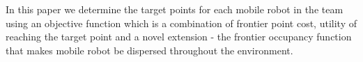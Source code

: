 In this paper we determine the target points for each mobile robot in the team using an objective function which is a combination of frontier point cost, utility of reaching the target point and a novel extension - the frontier occupancy function that makes mobile robot be dispersed throughout the environment. 
